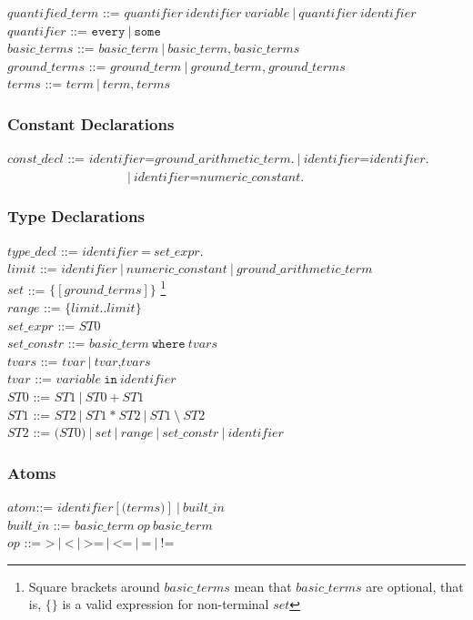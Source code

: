 \documentclass[a4paper,10pt]{article}
\begin{document}
\noindent
$quantified\_term$ ::= $quantifier~identifier~variable~|~quantifier~identifier$\\
$quantifier$ ::= $\texttt{every}~|~\texttt{some}$ \\
$basic\_terms$ ::= $basic\_term~|~basic\_term\texttt{,} ~basic\_terms$ \\
$ground\_terms$ ::= $ground\_term~|~ground\_term\texttt{,} ~ground\_terms$ \\
$terms$ ::= $term~|~term\texttt{,}~ terms$ \\

\subsubsection{Constant Declarations}
$const\_decl$ ::= $identifier \texttt{=} ground\_arithmetic\_term.~|~identifier \texttt{=} identifier.~$\\
~~~~~~~~~~$~~~~~~~~~~~~~~~~~~~~|~identifier \texttt{=} numeric\_constant.$
\subsubsection{Type Declarations}

$type\_decl$ ::= $identifier~ \texttt{=} ~set\_expr.$\\
$limit$ ::= $identifier~|~numeric\_constant~|~ground\_arithmetic\_term$\\
$set$ ::= $\texttt{\{} [ground\_terms] \texttt{\}}$ \footnote{Square brackets around $basic\_terms$ mean that $basic\_terms$ are optional, that is, $\{ \}$  is a valid expression for non-terminal $set$}\\
$range$ ::= $\texttt{\{}limit..limit\texttt{\}}$\\
$set\_expr$ ::= $ST0$ \\  
$set\_constr$ ::= $basic\_term~\texttt{where}~tvars $\\
$tvars$ ::= $tvar~|~tvar\texttt{,} tvars$\\
$tvar$ ::= $variable~\texttt{in}~identifier$  \\
$ST0$ ::= $ST1~|~ST0~\texttt{+}~ST1$\\
$ST1$ ::= $ST2~|~ST1~\texttt{*}~ST2~|~ST1~\texttt{\textbackslash}~ST2$ \\
$ST2$ ::= $\texttt{(}ST0\texttt{)}~|~set~|~range~|~set\_constr~|~identifier$  \\


\subsubsection{Atoms}
$atom$::= $identifier [\texttt{(} terms \texttt{)}]~|~built\_in $\\
$built\_in$ ::= $ basic\_term~op~basic\_term$\\
$op$ ::= $\texttt{>}~|~\texttt{<}~|~\texttt{>=}~|~\texttt{<=}~|~\texttt{=}~|~\texttt{!=}$ \\
\end{document}
